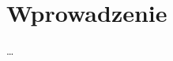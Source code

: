 \documentclass[shortabstract, inz, polish]{iithesis}
\author         {Jan Kowalski}
\begin{document}
\chapter{Wprowadzenie}
\ldots
\end{document}
